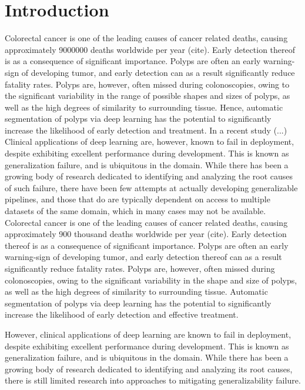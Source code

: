 \chapter{Introduction}
\setcounter{chapter}{1}
Colorectal cancer is one of the leading causes of cancer related deaths, causing approximately 9000000 deaths worldwide per year (cite). Early detection thereof is as a consequence of significant importance. Polyps are often an early warning-sign of developing tumor, and early detection can as a result significantly reduce fatality rates. Polyps are, however, often missed during colonoscopies, owing to the significant variability in the range of possible shapes and sizes of polyps, as well as the high degrees of similarity to surrounding tissue. Hence, automatic segmentation of polyps via deep learning has the potential to significantly increase the likelihood of early detection and treatment. In a recent study (...) %
Clinical applications of deep learning are, however, known to fail in deployment, despite exhibiting excellent performance during development. This is known as generalization failure, and is ubiquitous in the domain. While there has been a growing body of research dedicated to identifying and analyzing the root causes of such failure, there have been few attempts at actually developing generalizable pipelines, and those that do are typically dependent on access to multiple datasets of the same domain, which in many cases may not be available.
Colorectal cancer is one of the leading causes of cancer related deaths, causing approximately 900 thousand deaths worldwide per year (cite). Early detection thereof is as a consequence of significant importance. Polyps are often an early warning-sign of developing tumor, and early detection thereof can as a result significantly reduce fatality rates. Polyps are, however, often missed during colonoscopies, owing to the significant variability in the shape and size of polyps, as well as the high degrees of similarity to surrounding tissue. Automatic segmentation of polyps via deep learning has the potential to significantly increase the likelihood of early detection and effective treatment.

However, clinical applications of deep learning are known to fail in deployment, despite exhibiting excellent performance during development. This is known as generalization failure, and is ubiquitous in the domain. While there has been a growing body of research dedicated to identifying and analyzing its root causes, there is still limited research into approaches to mitigating generalizability failure.


